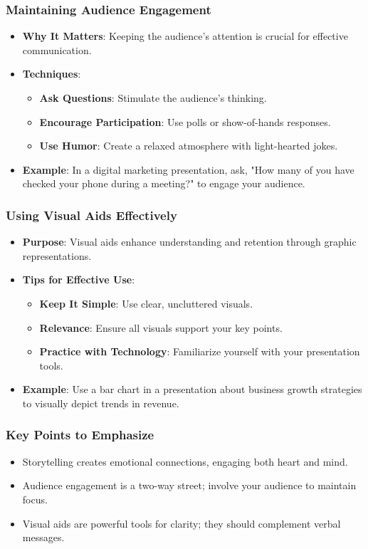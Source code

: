 \documentclass[aspectratio=169]{beamer}
\begin{document}
\begin{frame}[fragile]
    \frametitle{Maintaining Audience Engagement}
    \begin{itemize}
        \item \textbf{Why It Matters}: Keeping the audience's attention is crucial for effective communication.
        \item \textbf{Techniques}:
        \begin{itemize}
            \item \textbf{Ask Questions}: Stimulate the audience's thinking.
            \item \textbf{Encourage Participation}: Use polls or show-of-hands responses.
            \item \textbf{Use Humor}: Create a relaxed atmosphere with light-hearted jokes.
        \end{itemize}
        \item \textbf{Example}: In a digital marketing presentation, ask, "How many of you have checked your phone during a meeting?" to engage your audience.
    \end{itemize}
\end{frame}

\begin{frame}[fragile]
    \frametitle{Using Visual Aids Effectively}
    \begin{itemize}
        \item \textbf{Purpose}: Visual aids enhance understanding and retention through graphic representations.
        \item \textbf{Tips for Effective Use}:
        \begin{itemize}
            \item \textbf{Keep It Simple}: Use clear, uncluttered visuals.
            \item \textbf{Relevance}: Ensure all visuals support your key points.
            \item \textbf{Practice with Technology}: Familiarize yourself with your presentation tools.
        \end{itemize}
        \item \textbf{Example}: Use a bar chart in a presentation about business growth strategies to visually depict trends in revenue.
    \end{itemize}
\end{frame}

\begin{frame}[fragile]
    \frametitle{Key Points to Emphasize}
    \begin{itemize}
        \item Storytelling creates emotional connections, engaging both heart and mind.
        \item Audience engagement is a two-way street; involve your audience to maintain focus.
        \item Visual aids are powerful tools for clarity; they should complement verbal messages.
    \end{itemize}
\end{frame}
\end{document}
